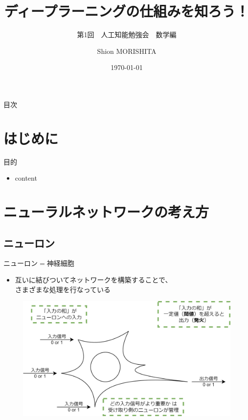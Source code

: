\documentclass[dvipdfmx,aspectratio=169]{beamer}
\title{ディープラーニングの仕組みを知ろう！}
\subtitle{第1回　人工知能勉強会　数学編}
\author{Shion MORISHITA}
\institute{}
\date{\today}
\begin{document}
	\begin{frame}[plain]
	    \maketitle
	\end{frame}
		
	\begin{frame}[shrink]{目次}
		\vspace{1em}
		\tableofcontents
	\end{frame}
	
	\section{はじめに}
	\begin{frame}{目的}
		\begin{itemize}
			\item content
		\end{itemize}
	\end{frame}

	\section{ニューラルネットワークの考え方}
	\subsection{ニューロン}
	\begin{frame}{ニューロン$ = $神経細胞}
		\begin{itemize}
			\item 互いに結びついてネットワークを構築することで、\\さまざまな処理を行なっている
		\end{itemize}

		\begin{figure}
			\centering
			\includegraphics[width=0.6\linewidth]{img/ニューロンの働き}
		\end{figure}
	\end{frame}
	
\end{document}
